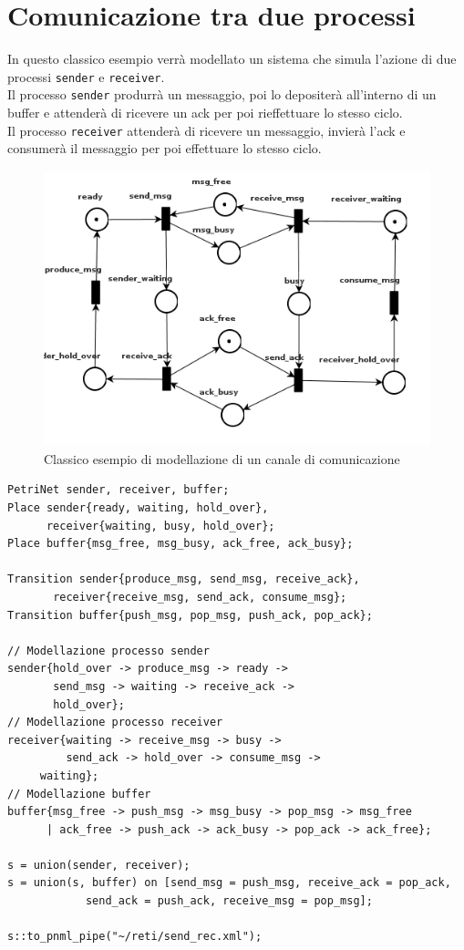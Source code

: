 \documentclass[italian,12pt]{book}
\begin{document}
\section{Comunicazione tra due processi}
In questo classico esempio verrà modellato un sistema che simula l'azione di due processi {\tt sender} e {\tt receiver}.\\
Il processo {\tt sender} produrrà un messaggio, poi lo depositerà all'interno di un buffer e attenderà di ricevere un ack per poi rieffettuare lo stesso ciclo.\\
Il processo {\tt receiver} attenderà di ricevere un messaggio, invierà l'ack e consumerà il messaggio per poi effettuare lo stesso ciclo.\\

\begin{figure}[htb]
\centerline{\includegraphics[width=12cm, height=8cm]{img/send_rec.png}}
\caption{Classico esempio di modellazione di un canale di comunicazione}\label{fig:send_rec.png}
\end{figure}

\begin{verbatim}PetriNet sender, receiver, buffer;
Place sender{ready, waiting, hold_over}, 
      receiver{waiting, busy, hold_over};
Place buffer{msg_free, msg_busy, ack_free, ack_busy};

Transition sender{produce_msg, send_msg, receive_ack}, 
	   receiver{receive_msg, send_ack, consume_msg};
Transition buffer{push_msg, pop_msg, push_ack, pop_ack};

// Modellazione processo sender
sender{hold_over -> produce_msg -> ready -> 
       send_msg -> waiting -> receive_ack -> 
       hold_over};
// Modellazione processo receiver
receiver{waiting -> receive_msg -> busy -> 
         send_ack -> hold_over -> consume_msg -> 
	 waiting};
// Modellazione buffer
buffer{msg_free -> push_msg -> msg_busy -> pop_msg -> msg_free 
      | ack_free -> push_ack -> ack_busy -> pop_ack -> ack_free};

s = union(sender, receiver);
s = union(s, buffer) on [send_msg = push_msg, receive_ack = pop_ack, 
			send_ack = push_ack, receive_msg = pop_msg];

s::to_pnml_pipe("~/reti/send_rec.xml");
\end{verbatim}
\end{document}
